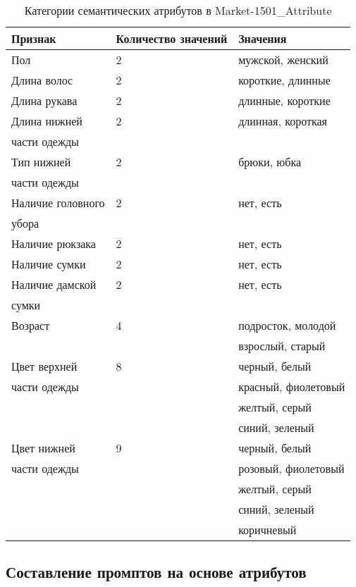 \begin{table}[]
	\centering
	\caption{Категории семантических атрибутов в Market-1501\_Attribute}
	\begin{tabular}{|l|l|l|}
		\hline
		\multicolumn{1}{|l|}{Признак} & \multicolumn{1}{l|}{Количество значений} & 
		\multicolumn{1}{l|}{Значения}\\ \hline
		Пол & 2 & мужской, женский \\ \hline
		Длина волос & 2 & короткие, длинные \\ \hline
		Длина рукава & 2 & длинные, короткие \\ \hline
		Длина нижней & 2 & длинная, короткая \\
		части одежды & & \\ \hline
		Тип нижней & 2 & брюки, юбка \\
		части одежды & & \\ \hline
		Наличие головного & 2 & нет, есть \\
		убора & & \\ \hline
		Наличие рюкзака & 2 & нет, есть \\ \hline
		Наличие сумки & 2 & нет, есть \\ \hline
		Наличие дамской & 2 & нет, есть \\
		сумки & & \\ \hline
		Возраст & 4 & подросток, молодой \\
		& & взрослый, старый \\ \hline
		Цвет верхней & 8 & черный, белый \\
		части одежды & & красный, фиолетовый \\
		& & желтый, серый \\
		& & синий, зеленый \\ \hline
		Цвет нижней & 9 & черный, белый \\
		части одежды & & розовый, фиолетовый \\
		& & желтый, серый \\
		& & синий, зеленый \\
		& & коричневый \\ \hline
	\end{tabular}
	\label{tab:market_attributes}
\end{table}

\subsection{Составление промптов на основе атрибутов}

